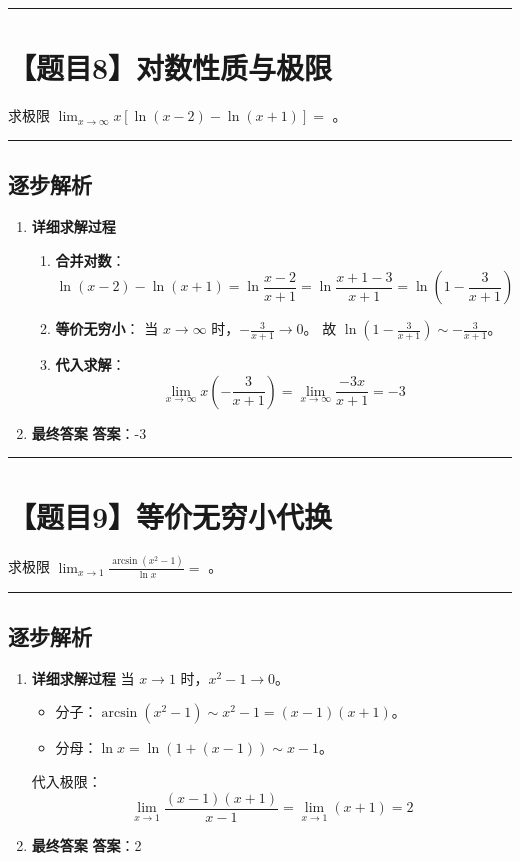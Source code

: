 \documentclass[UTF8]{ctexart}
\newenvironment{redenv}{\color{red}}{}
\newenvironment{detailedanalysis}{%
    \color{red}
    \begin{enumerate}[label=\textbf{第\arabic*步：}, leftmargin=*, align=left, itemsep=1.5ex]
}{%
    \end{enumerate}
}
\newcommand{\problemrule}{\noindent\rule{\textwidth}{1.5pt}\vspace{-0.8em}}
\newcommand{\analysisrule}{\noindent\rule{\textwidth}{0.8pt}\vspace{-0.8em}}
\newcommand{\blank}[1]{\underline{\hspace{#1}}}
\begin{document}
\problemrule
\section*{【题目8】对数性质与极限}
求极限 $ \lim_{x\to\infty}x[\ln(x-2)-\ln(x+1)]= $ \blank{2cm}。

\begin{redenv}
\analysisrule
\subsection*{逐步解析}

\begin{detailedanalysis}
\item \textbf{详细求解过程}
\begin{enumerate}[label=(\arabic*)]
\item \textbf{合并对数}：
$$ \ln(x-2) - \ln(x+1) = \ln\frac{x-2}{x+1} = \ln\frac{x+1-3}{x+1} = \ln(1 - \frac{3}{x+1}) $$
\item \textbf{等价无穷小}：
当 $x \to \infty$ 时，$-\frac{3}{x+1} \to 0$。
故 $\ln(1 - \frac{3}{x+1}) \sim -\frac{3}{x+1}$。
\item \textbf{代入求解}：
$$ \lim_{x\to\infty} x \left( -\frac{3}{x+1} \right) = \lim_{x\to\infty} \frac{-3x}{x+1} = -3 $$
\end{enumerate}

\item \textbf{最终答案}
\textbf{答案}：-3
\end{detailedanalysis}
\end{redenv}

\problemrule
\section*{【题目9】等价无穷小代换}
求极限 $ \lim_{x\to1}\frac{\arcsin(x^{2}-1)}{\ln x}= $ \blank{2cm}。

\begin{redenv}
\analysisrule
\subsection*{逐步解析}

\begin{detailedanalysis}
\item \textbf{详细求解过程}
当 $x \to 1$ 时，$x^2 - 1 \to 0$。
\begin{itemize}
    \item 分子：$\arcsin(x^2 - 1) \sim x^2 - 1 = (x-1)(x+1)$。
    \item 分母：$\ln x = \ln(1 + (x-1)) \sim x - 1$。
\end{itemize}
代入极限：
$$ \lim_{x\to1} \frac{(x-1)(x+1)}{x-1} = \lim_{x\to1} (x+1) = 2 $$

\item \textbf{最终答案}
\textbf{答案}：2
\end{detailedanalysis}
\end{redenv}
\end{document}
